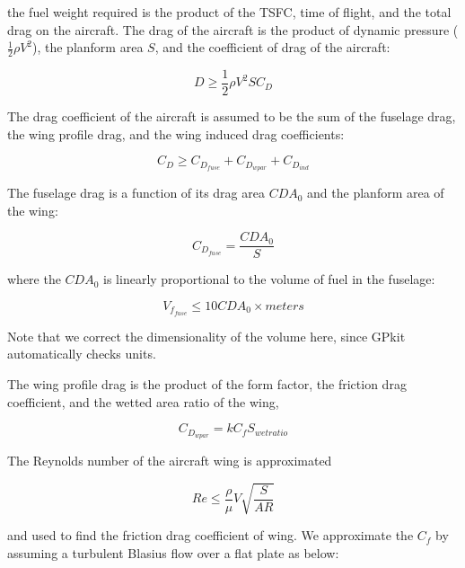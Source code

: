 \documentclass[]{article}
\begin{document}
the fuel weight required is the product of the TSFC, time of flight, and
the total drag on the aircraft. The drag of the aircraft is the product
of dynamic pressure (\(\frac{1}{2} \rho V^2\)), the planform area \(S\),
and the coefficient of drag of the aircraft:

\begin{equation} 
    D \geq \frac{1}{2}  \rho V^2 S  C_D
\label{e:d}
\end{equation}

The drag coefficient of the aircraft is assumed to be the sum of the
fuselage drag, the wing profile drag, and the wing induced drag
coefficients:

\begin{equation}
    C_D \geq C_{D_{fuse}} + C_{D_{wpar}} + C_{D_{ind}}
\label{e:cd}
\end{equation}

The fuselage drag is a function of its drag area \(CDA_0\) and the
planform area of the wing:

\begin{equation}
    C_{D_{fuse}} = \frac{CDA_0}{S}
\label{e:cdfuse}
\end{equation}

where the \(CDA_0\) is linearly proportional to the volume of fuel in
the fuselage:

\begin{equation}
    V_{f_{fuse}} \leq 10 CDA_0 \times meters
\label{e:vffuse}
\end{equation}

Note that we correct the dimensionality of the volume here, since GPkit
automatically checks units.

The wing profile drag is the product of the form factor, the friction
drag coefficient, and the wetted area ratio of the wing,

\begin{equation}
    C_{D_{wpar}} = k C_f S_{wetratio}
\label{e:cdwpar}
\end{equation}

The Reynolds number of the aircraft wing is approximated

\begin{equation}
    Re \leq \frac{\rho}{\mu} V \sqrt{\frac{S}{AR}}
\label{e:re}
\end{equation}

and used to find the friction drag coefficient of wing. We approximate
the \(C_f\) by assuming a turbulent Blasius flow over a flat plate as
below:
\end{document}
